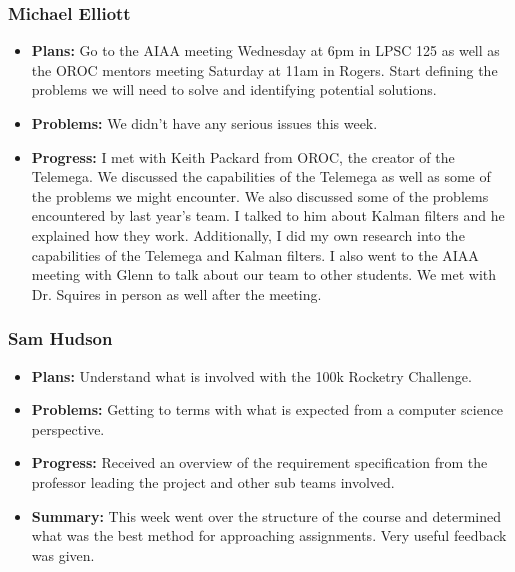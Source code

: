 \documentclass[onecolumn, draftclsnofoot,10pt, compsoc]{IEEEtran}
\begin{document}
\subsubsection{Michael Elliott}
\begin {itemize}
\item \textbf{Plans: }
  Go to the AIAA meeting Wednesday at 6pm in LPSC 125 as well as the OROC mentors meeting Saturday at 11am in Rogers. Start defining the problems we will need to solve and identifying potential solutions.
\item \textbf{Problems: }
  We didn't have any serious issues this week.
\item \textbf{Progress: }
  I met with Keith Packard from OROC, the creator of the Telemega. We discussed the capabilities of the Telemega as well as some of the problems we might encounter. We also discussed some of the problems encountered by last year's team. I talked to him about Kalman filters and he explained how they work. Additionally, I did my own research into the capabilities of the Telemega and Kalman filters. I also went to the AIAA meeting with Glenn to talk about our team to other students. We met with Dr. Squires in person as well after the meeting.
\end {itemize}
\subsubsection{Sam Hudson}
\begin {itemize}
\item \textbf{Plans: }Understand what is involved with the 100k Rocketry Challenge.
\item \textbf{Problems: }Getting to terms with what is expected from a computer science perspective. 
\item \textbf{Progress: }Received an overview of the requirement specification from the professor leading the project and other sub teams involved.
\item \textbf{Summary: }This week went over the structure of the course and determined what was the best method for approaching assignments. Very useful feedback was given.
\end {itemize}
\end{document}
